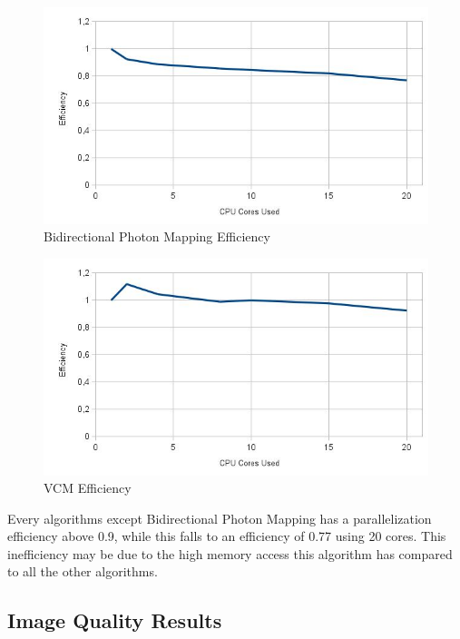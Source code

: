 \begin{figure}[H]
\includegraphics[width=\linewidth]{img/bpmEff.jpg}
\caption{\label{img:bpmEff} Bidirectional Photon Mapping Efficiency}
\end{figure}

\begin{figure}[H]
\includegraphics[width=\linewidth]{img/vcmEff.jpg}
\caption{\label{img:vcmEff} VCM Efficiency}
\end{figure}

Every algorithms except Bidirectional Photon Mapping has a parallelization efficiency above 0.9, while this falls to an efficiency of 0.77 using 20 cores. This inefficiency may be due to the high memory access this algorithm has compared to all the other algorithms.

\subsection{Image Quality Results}

